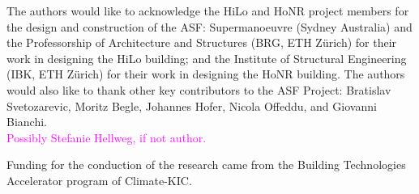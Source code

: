 
The authors would like to acknowledge the HiLo and HoNR project members for the design and construction of the ASF: Supermanoeuvre (Sydney Australia) and the Professorship of Architecture and Structures (BRG, ETH Zürich) for their work in designing the HiLo building; and the Institute of Structural Engineering (IBK, ETH Zürich) for their work in designing the HoNR building. The authors would also like to thank other key contributors to the ASF Project: Bratislav Svetozarevic, Moritz Begle, Johannes Hofer, Nicola Offeddu, and Giovanni Bianchi. \\
\textcolor{magenta}{Possibly Stefanie Hellweg, if not author.}

Funding for the conduction of the research came from the Building Technologies Accelerator program of Climate-KIC.